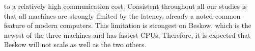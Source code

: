 \documentclass{sig-alternate}
\begin{document}
to a relatively high communication cost. Consistent throughout all our studies is 
that all machines are strongly limited by the latency, already a noted common 
feature of modern computers. This limitation is strongest on
Beskow, which is the newest of the three machines and has fastest CPUs. Therefore,
it is expected that Beskow will not scale as well as the two others.
\end{document}
